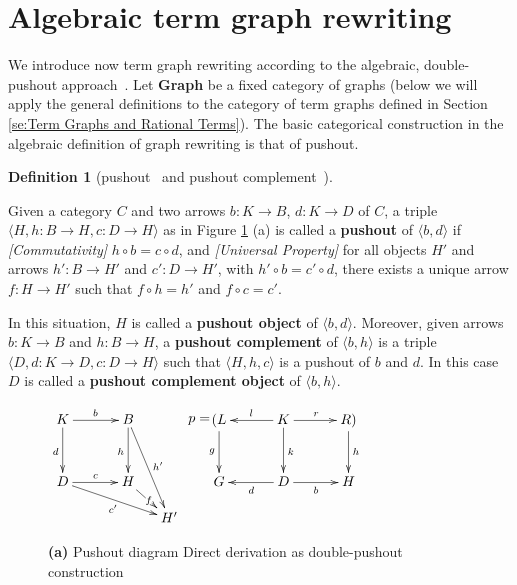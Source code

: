 \documentclass{eptcs}
\theoremstyle{plain}
\theoremstyle{definition}
\newtheorem{definition}[theorem]{Definition}
\begin{document}
\section{Algebraic term graph rewriting}
\label{se:Algebraic term graph rewriting}

We introduce now term graph rewriting according to the algebraic, 
double-pushout approach~\cite{Ehr:TIAA}. 
Let {\bf Graph} be a fixed category of graphs (below we will apply the 
general definitions to the category of term graphs defined in Section 
\ref{se:Term Graphs and Rational Terms}). The basic categorical 
construction in the 
algebraic definition of graph rewriting is that of pushout.

\begin{definition}
[pushout~\cite{ML:CWM} and pushout complement~\cite{Ehr:TIAA}]
\label{de:pushout} 

Given a category $C$ and two arrows $b:
K \rightarrow B$, $d: K \rightarrow D$ of $C$, a triple  $\langle  H, 
h:
B \rightarrow H, c: D \rightarrow H \rangle $  as in Figure 
\ref{fi:pushout} (a)
is called a {\bf pushout \/} of  $\langle  b, d \rangle $  if 
{\em[Commutativity]} $h  \circ  b = c  \circ  d$, and 
{\em [Universal Property]} for all objects $H'$ and arrows 
$h': B
 \rightarrow  H'$ and $c': D  \rightarrow  H'$, with $h'  \circ  b =
c'  \circ  d$, there exists a unique arrow $f: H  \rightarrow  H' $
such that $f  \circ  h = h'$ and $f  \circ  c = c'$.

In this situation, $H$ is called a {\bf pushout object} of  $\langle  
b, d
\rangle $.
Moreover, given arrows $b: K \rightarrow B$ and $h: B \rightarrow H$,
a {\bf pushout complement \/} of  $\langle  b, h \rangle $  is a 
triple
$\langle  D, d:
K \rightarrow D, c: D \rightarrow H \rangle $  such that  $\langle  H, 
h, c
\rangle $  is
a pushout of $b$ and $d$. In this case $D$ is called a {\bf pushout
complement object \/} of  $\langle  b, h \rangle $.
\end{definition}

\begin{figure}
\begin{center}
$    \xymatrix@=3ex{
     {K} \ar[dd]_d \ar[rr]^b & & {B} \ar[dd]_h \ar[dddr]^{h'} &  \\
 & & &\\
         {D} \ar[rr]^c \ar[drrr]_{c'} & & {H} \ar[dr]|f & \\
         & & & {H'} 
      }
$
\hspace{2cm}
$    \xymatrix@=7ex{
      {(L} \save []-<.5cm, .0cm>*\txt{$p=$} \restore
      \ar[d]_g & {K} \ar@{->}[l]_{l} \ar@{->}[r]^{r} \ar[d]^k & {R)} \ar[d]^h\\
      {G} & {D} \ar[l]^d \ar[r]_b & {H}
      }
$
\end{center}
\caption{{\bf (a)} Pushout diagram 
Direct derivation as double-pushout construction}
\label{fi:pushout}
\end{figure}
\end{document}
